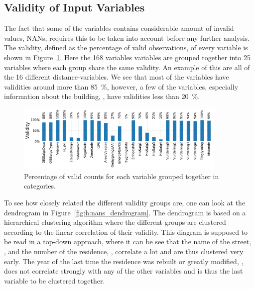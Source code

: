 \subsection{Validity of Input Variables}

The fact that some of the variables contains considerable amount of invalid values, NANs, requires this to be taken into account before any further analysis. The validity, defined as the percentage of valid observations, of every variable is shown in Figure~\ref{fig:h:nans}. Here the \num{168} variables variables are grouped together into \num{25} variables where each group share the same validity. An example of this are all of the \num{16} different distance-variables. We see that most of the variables have validities around more than 
\SI{85}{\percent}, however, a few of the variables, especially information about the building, , have validities less than \SI{20}{\percent}. 


\begin{figure}
  \centerfloat
  \includegraphics[width=0.9\textwidth, trim=0 0 0 0, clip]{figures/housing/missing_bar.pdf}
  \caption[Validity of Input Features]
          {Percentage of valid counts for each variable grouped together in categories.}
  \label{fig:h:nans}
\end{figure}

To see how closely related the different validity groups are, one can look at the dendrogram in Figure~\ref{fig:h:nans_dendrogram}. The dendrogram is based on a hierarchical clustering algorithm \citep{virtanenSciPyFundamentalAlgorithms2019} where the different groups are clustered according to the linear correlation of their validity. This diagram is supposed to be read in a top-down approach, where it can be see that the name of the street, , and the number of the residence, , correlate a lot and are thus clustered very early. The year of the last time the residence was rebuilt or greatly modified, , does not correlate strongly with any of the other variables and is thus the last variable to be clustered together. 

